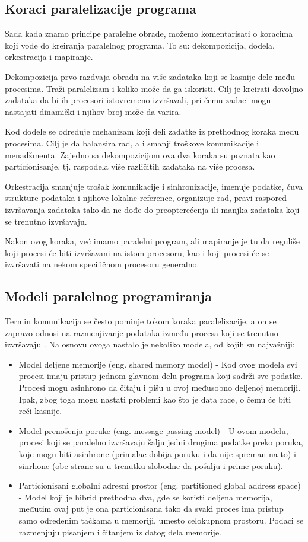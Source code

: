 \documentclass[a4paper]{article}
\begin{document}
\subsection{Koraci paralelizacije programa}
Sada kada znamo principe paralelne obrade, možemo komentarisati o koracima koji vode do kreiranja paralelnog programa. To su: dekompozicija, dodela, orkestracija i mapiranje.\par
Dekompozicija prvo razdvaja obradu na više zadataka koji se kasnije dele među procesima. Traži paralelizam i koliko može da ga iskoristi. Cilj je kreirati dovoljno zadataka da bi ih procesori istovremeno izvršavali, pri čemu zadaci mogu nastajati dinamički i njihov broj može da varira.\par 
Kod dodele se određuje mehanizam koji deli zadatke iz prethodnog koraka među procesima. Cilj je da balansira rad, a i smanji troškove komunikacije i menadžmenta. Zajedno sa dekompozicijom ova dva koraka su poznata kao particionisanje, tj. raspodela više različitih zadataka na više procesa. \par 
Orkestracija smanjuje trošak komunikacije i sinhronizacije, imenuje podatke, čuva strukture podataka i njihove lokalne reference, organizuje rad, pravi raspored izvršavanja zadataka tako da ne dođe do preopterećenja ili manjka zadataka koji se trenutno izvršavaju. \par 
Nakon ovog koraka, već imamo paralelni program, ali mapiranje je tu da reguliše koji procesi će biti izvršavani na istom procesoru, kao i koji procesi će se izvršavati na nekom specifičnom procesoru generalno. 
\subsection{Modeli paralelnog programiranja}
Termin komunikacija se često pominje tokom koraka paralelizacije, a on se zapravo odnosi na razmenjivanje podataka između procesa koji se trenutno izvršavaju \cite{models}. Na osnovu ovoga nastalo je nekoliko modela, od kojih su najvažniji: \\
\begin{itemize}
\item Model deljene memorije (eng. shared memory model) - Kod ovog modela svi procesi imaju pristup jednom glavnom delu programa koji sadrži sve podatke. Procesi mogu asinhrono da čitaju i pišu u ovoj međusobno deljenoj memoriji. Ipak, zbog toga mogu nastati problemi kao što je data race, o čemu će biti reči kasnije.
\item Model prenošenja poruke (eng. message passing model) - U ovom modelu, procesi koji se paralelno izvršavaju šalju jedni drugima podatke preko poruka, koje mogu biti asinhrone (primalac dobija poruku i da nije spreman na to) i sinrhone (obe strane su u trenutku slobodne da pošalju i prime poruku).
\item Particionisani globalni adresni prostor (eng. partitioned global address space) - Model koji je hibrid prethodna dva, gde se koristi deljena memorija, međutim ovaj put je ona particionisana tako da svaki proces ima pristup samo određenim tačkama u memoriji, umesto celokupnom prostoru. Podaci se razmenjuju pisanjem i čitanjem iz datog dela memorije.
\end{itemize}
	
\end{document}
